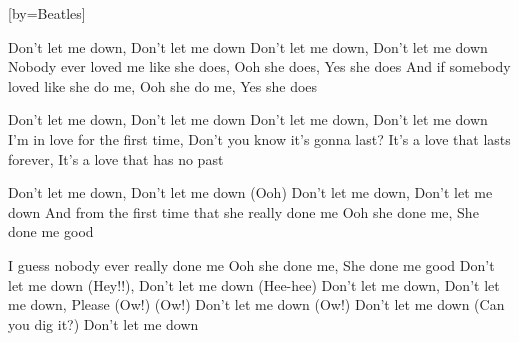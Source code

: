 

[by=Beatles]


\beginverse
Don't let me down, Don't let me down
Don't let me down, Don't let me down
Nobody ever loved me like she does, Ooh she does, Yes she does
And if somebody loved like she do me, Ooh she do me, Yes she does
\endverse

\beginverse
Don't let me down, Don't let me down
Don't let me down, Don't let me down
I'm in love for the first time, Don't you know it's gonna last?
It's a love that lasts forever, It's a love that has no past
\endverse

\beginverse
Don't let me down, Don't let me down  (Ooh)
Don't let me down, Don't let me down
And from the first time that she really done me
Ooh she done me, She done me good

I guess nobody ever really done me
Ooh she done me, She done me good
Don't let me down (Hey!!), Don't let me down (Hee-hee)
Don't let me down, Don't let me down, Please (Ow!)
(Ow!)
Don't let me down (Ow!)
Don't let me down (Can you dig it?)
Don't let me down
\endverse



\chordson
\endsong
